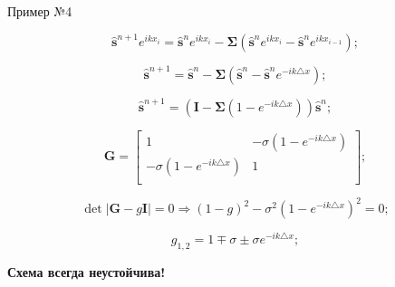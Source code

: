 \documentclass[10pt,xcolor=pst,aspectratio=169]{beamer}
\begin{document}
\begin{frame}{Пример №4}

    \transdissolve[duration=0.1]
    \justifying
    \large

    \[
        \hat{\mathbf{s}}^{n + 1} e^{i k x_{i}}
        =
        \hat{\mathbf{s}}^{n} e^{i k x_{i}} - \bm{\Sigma} \left( \hat{\mathbf{s}}^{n} e^{i k x_{i}} - \hat{\mathbf{s}}^{n} e^{i k x_{i - 1}} \right);
    \]

    \[
        \hat{\mathbf{s}}^{n + 1}
        =
        \hat{\mathbf{s}}^{n} - \bm{\Sigma} \left( \hat{\mathbf{s}}^{n} - \hat{\mathbf{s}}^{n} e^{-i k \triangle x} \right);
    \]

    \[
        \hat{\mathbf{s}}^{n + 1}
        =
        \boxed{\left( \mathbf{I} - \bm{\Sigma} \left( 1 - e^{-i k \triangle x} \right) \right)} \hat{\mathbf{s}}^{n};
    \]



%

    \[
        \mathbf{G}
        =
        \begin{bmatrix}
           1 & -\sigma \left( 1 - e^{-i k \triangle x} \right) \\
           -\sigma \left( 1 - e^{-i k \triangle x} \right) & 1 \\
        \end{bmatrix};
    \]

    \[
        \det \left| \mathbf{G} - g \mathbf{I} \right| = 0
        \Rightarrow
        \left( 1 - g \right)^{2} - \sigma^{2} \left( 1 - e^{-i k \triangle x} \right)^{2} = 0;
    \]

    \[
        g_{1,2} = 1 \mp \sigma \pm \sigma e^{-i k \triangle x};
    \]

    \begin{center}
        \textbf{Схема всегда неустойчива!}
    \end{center}

\end{frame}
\end{document}
